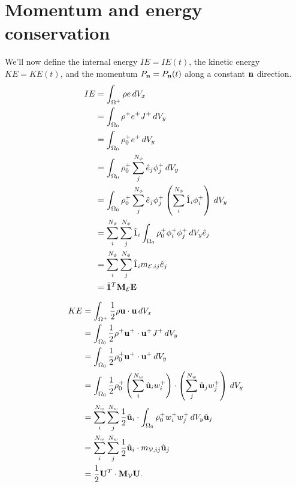 \documentclass[11pt]{report}
\begin{document}
\section{Momentum and energy conservation}
We'll now define the internal energy $IE=IE(t)$, the kinetic energy $KE=KE(t)$, and the momentum $P_{\mathbf{n}}=P_{\mathbf{n}}(t)$ along a constant $\mathbf{n}$ direction.
\begin{align}
    IE &= \int_{\Omega^+} \rho e \, dV_x \nonumber \\
    &= \int_{\Omega_0} \rho^+ e^+ J^+ \, dV_y \nonumber \\
    &= \int_{\Omega_0} \rho^+_0 e^+ \, dV_y \nonumber \\
    &= \int_{\Omega_0} \rho_0^+ \sum_{j}^{N_\phi} \hat{e}_j \phi_j^+ \, dV_y \nonumber \\
    &= \int_{\Omega_0} \rho_0^+ \sum_{j}^{N_\phi} \hat{e}_j \phi_j^+ \left ( \sum_{i}^{N_\phi} \hat{1}_i \phi^+_i \right ) \, dV_y \nonumber \\
    &= \sum_i^{N_\phi} \sum_j^{N_\phi} \hat{1}_i \int_{\Omega_0} \rho_0^+ \phi_i^+ \phi_j^+ \, dV_y \hat{e}_j \nonumber \\
    &= \sum_i^{N_\phi} \sum_j^{N_\phi} \hat{1}_i m_{\mathcal{E},ij} \hat{e}_j \nonumber \\
    &= \hat{\mathbf{1}}^T \mathbf{M}_\mathcal{E} \mathbf{E} 
\end{align}

\begin{align}
    KE &= \int_{\Omega^+} \frac{1}{2} \rho \mathbf{u} \cdot \mathbf{u} \, dV_x \nonumber \\
    &= \int_{\Omega_0} \frac{1}{2} \rho^+ \mathbf{u}^+ \cdot \mathbf{u}^+ J^+ \, dV_y \nonumber \\
    &= \int_{\Omega_0} \frac{1}{2} \rho_0^+ \mathbf{u}^+ \cdot \mathbf{u}^+ \, dV_y \nonumber \\
    &= \int_{\Omega_0} \frac{1}{2} \rho_0^+ \left ( \sum_i^{N_w} \hat{\mathbf{u}}_i w_i^+ \right ) \cdot \left ( \sum_j^{N_w} \hat{\mathbf{u}}_j w_j^+ \right ) \, dV_y \nonumber \\
    &= \sum_i^{N_w} \sum_j^{N_w} \frac{1}{2} \hat{\mathbf{u}}_i \cdot \int_{\Omega_0}\rho_0^+ w_i^+ w_j^+ \, dV_y \hat{\mathbf{u}}_j \nonumber \\
    &= \sum_i^{N_w} \sum_j^{N_w} \frac{1}{2} \hat{\mathbf{u}}_i \cdot m_{\mathcal{V},ij} \hat{\mathbf{u}}_j \nonumber \\
    &= \frac{1}{2} \mathbf{U}^T \cdot \mathbf{M}_\mathcal{V} \mathbf{U}.
\end{align}
\end{document}
